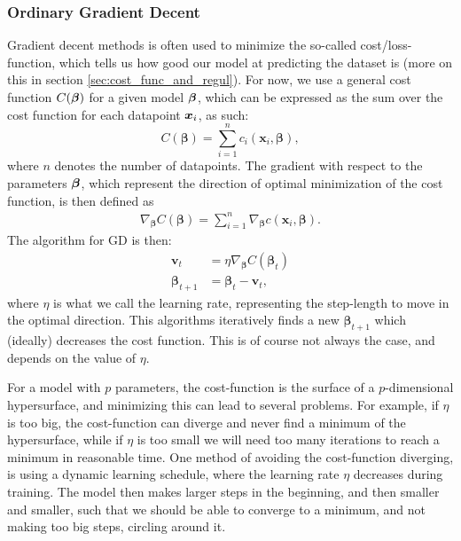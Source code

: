 \documentclass[12pt]{extarticle}
\begin{document}
\subsubsection{Ordinary Gradient Decent}
Gradient decent methods is often used to minimize the so-called cost/loss-function, which tells us how good our model at predicting the dataset is (more on this in section \ref{sec:cost_func_and_regul}). For now, we use a general cost function $C(\boldsymbol{\beta})$ for a given model $\boldsymbol{\beta}$, which can be expressed as the sum over the cost function for each datapoint $\boldsymbol x_i$, as such:
\begin{equation}
	C(\boldsymbol{\beta}) = \sum_{i = 1}^{n}c_i(\mathbf{x}_i, \boldsymbol{\beta}),
\end{equation}
where $n$ denotes the number of datapoints. The gradient with respect to the parameters $\boldsymbol{\beta}$, which represent the direction of optimal minimization of the cost function,  is then defined as
\begin{align}
	\nabla_{\boldsymbol{\beta}} C(\boldsymbol{\beta}) = \sum_{i = 1}^{n} \nabla_{\boldsymbol{\beta}} c(\mathbf{x}_i, \boldsymbol{\beta}).
	\label{eq:Total_gradient}
\end{align}
The algorithm for GD is then:
\begin{align}
	\mathbf{v}_t             & = \eta \nabla_{\boldsymbol{\beta}} C(\boldsymbol{\beta}_t) \nonumber \\
	\boldsymbol{\beta}_{t+1} & = \boldsymbol{\beta}_t - \mathbf{v}_t,
	\label{eq:GD_algo}
\end{align}
where $\eta$ is what we call the learning rate, representing the step-length to move in the optimal direction.  This algorithms iteratively finds a new $\boldsymbol{\beta}_{t+1}$ which (ideally) decreases the cost function. This is of course not always the case, and depends on the value of $\eta$.

For a model with $p$ parameters, the cost-function is the surface of a $p$-dimensional hypersurface, and minimizing this can lead to several problems. For example, if $\eta$  is too big, the cost-function can diverge and never find a minimum of the hypersurface, while if $\eta$ is too small we will need too many iterations to reach a minimum in reasonable time. One method of avoiding the cost-function diverging, is using a dynamic learning schedule, where the learning rate $\eta$ decreases during training. The model then makes larger steps in the beginning, and then smaller and smaller, such that we should be able to converge to a minimum, and not making too big steps, circling around it.
\end{document}

